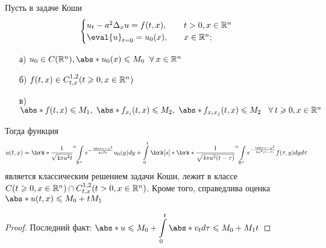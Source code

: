 	\begin{theorem}
		Пусть в задаче Коши
			\begin{equation*}
				\begin{cases}
					u_t - a^2 \Delta_x u = f(t,x), \quad & t > 0, x \in \R^n \\
					\eval{u}_{t=0} = u_0(x), \quad & x \in \R^n;
				\end{cases}
			\end{equation*}
		\begin{itemize}
			\item[а)] $u_0 \in C(\R^n), \abs*{u_0(x)} \leqslant M_0 \Forall x \in \R^n$
			\item[б)] $f(t,x) \in C^{1,2}_{t,x}(t \geqslant 0, x \in \mathbb{R}^n)$ 
            \item[в)] $\abs*{f(t,x)}\leq M_1,\ \abs*{f_{x_i}(t,x)}\leq M_2,\ \abs*{f_{x_ix_j}(t,x)}\leq M_2\ \Forall t\geq 0, x\in\R^n$ 
		\end{itemize}
		Тогда функция $$u(t,x) = \brk*{\dfrac{1}{\sqrt{4\pi a^2t}}}^n \displaystyle\int\limits_{\R^n} e^{-\frac{\abs*{x-y}^2}{4a^2t}} u_0(y)dy + \displaystyle\int\limits_0^t \brk[s]*{\brk*{\dfrac{1}{\sqrt{4\pi a^2(t-\tau)}}}^n \displaystyle\int\limits_{\R^n} e^{-\frac{\abs*{x-y}^2}{4a^2(t-\tau)}} f(\tau,y) dy} d\tau$$
		является классическим решением задачи Коши, лежит в классе $C(t \geqslant 0, x \in \mathbb{R}^n) \cap C^{1,2}_{t,x}(t > 0, x \in \mathbb{R}^n)$. Кроме того, справедлива оценка $\abs*{u(t,x)} \leqslant M_0 + tM_1$
	\end{theorem}
	\begin{proof}
		Последний факт: $\abs*{u} \leqslant M_0 + \displaystyle\int\limits_0^t \abs*{v_t} d\tau \leqslant M_0 + M_1t$
	\end{proof}